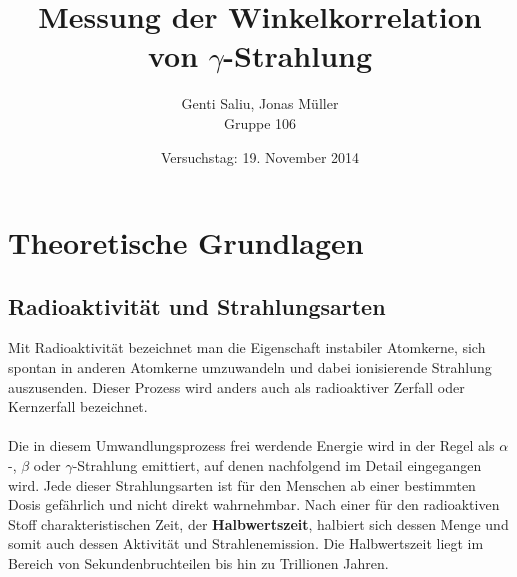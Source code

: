 \documentclass[a4paper,titlepage]{scrartcl}
\title{Messung der Winkelkorrelation von $\gamma$-Strahlung}
\author{Genti Saliu, Jonas Müller\\Gruppe 106}
\date{Versuchstag: 19. November 2014}
\numberwithin{equation}{section}
\begin{document}
	\begin{titlepage}
		\maketitle
		\thispagestyle{empty}
	\end{titlepage}
	
\newpage
{}
\tableofcontents

\newpage
{}

\section{Theoretische Grundlagen}
\subsection{Radioaktivität und Strahlungsarten \cite{wiki:radioactivity}}
Mit Radioaktivität bezeichnet man die Eigenschaft instabiler Atomkerne, sich spontan in anderen Atomkerne umzuwandeln und dabei ionisierende Strahlung auszusenden. Dieser Prozess wird anders auch als radioaktiver Zerfall oder Kernzerfall bezeichnet.\\ \\
Die in diesem Umwandlungsprozess frei werdende Energie wird in der Regel als $\alpha$-, $\beta$ oder $\gamma$-Strahlung emittiert, auf denen nachfolgend im Detail eingegangen wird. Jede dieser Strahlungsarten ist für den Menschen ab einer bestimmten Dosis gefährlich und nicht direkt wahrnehmbar. Nach einer für den radioaktiven Stoff charakteristischen Zeit, der \textbf{Halbwertszeit}, halbiert sich dessen Menge und somit auch dessen Aktivität und Strahlenemission. Die Halbwertszeit liegt im Bereich von Sekundenbruchteilen bis hin zu Trillionen Jahren.
\end{document}
